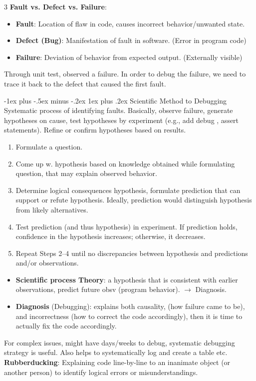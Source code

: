 \documentclass[a4paper, 10pt, landscape]{article}
\makeatletter
\renewcommand{\subsubsection}{\@startsection{subsubsection}{3}{0mm}%
                                {-1ex plus -.5ex minus -.2ex}%
                                {1ex plus .2ex}%
                                {\normalfont\small\bfseries}}
\makeatother
\begin{document}
\begin{multicols*}{3}
\textbf{Fault vs. Defect vs. Failure}:
\begin{itemize}[itemsep=-1pt]
\item \textbf{Fault}: Location of flaw in code, causes incorrect behavior/unwanted state.
\item \textbf{Defect (Bug)}: Manifestation of fault in software. (Error in program code)
\item \textbf{Failure}: Deviation of behavior from expected output. (Externally visible)
\end{itemize}
Through unit test, observed a failure. In order to debug the failure, we need to trace it back to the defect that caused the first fault.


\subsubsection{Scientific Method to Debugging}
Systematic process of identifying faults. Basically, observe failure, generate hypotheses on cause, test hypotheses by experiment (e.g., add debug , assert statements). Refine or confirm hypotheses based on results.
\begin{enumerate}[itemsep=-1.5pt]
\item Formulate a question.
\item Come up w. hypothesis based on knowledge obtained while formulating question, that may explain observed behavior.
\item Determine logical consequences hypothesis, formulate prediction that can support or refute hypothesis. Ideally, prediction would distinguish hypothesis from likely alternatives.
\item Test prediction (and thus hypothesis) in experiment. If prediction holds, confidence in the hypothesis increases; 
otherwise, it decreases.
\item Repeat Steps 2–4 until no discrepancies between hypothesis and predictions and/or observations.
\end{enumerate}
\begin{itemize}
\item \textbf{Scientific process Theory}: a hypothesis that is consistent with earlier observations, predict future obsv (program behavior). $\rightarrow$ Diagnosis.
\item \textbf{Diagnosis} (Debugging): explains both causality, (how failure came to be), and incorrectness (how to correct the code accordingly), then it is time to actually fix the code accordingly.
\end{itemize}
For complex issues, might have days/weeks to debug, systematic debugging strategy is useful. Also helps to systematically log and create a table etc.  \\ \smallskip
\textbf{Rubberducking}: Explaining code line-by-line to an inanimate object (or another person) to identify logical errors or misunderstandings.


\end{multicols*}
\end{document}

